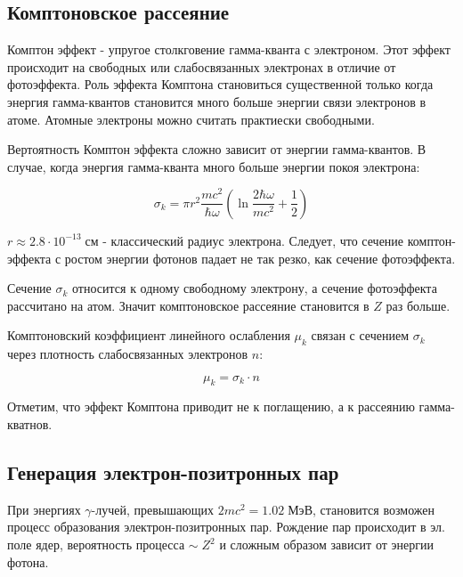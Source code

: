 \documentclass[a4paper]{article}
\begin{document}
\subsection{Комптоновское рассеяние}

Комптон эффект - упругое столкговение гамма-кванта с электроном. Этот эффект происходит на свободных 
или слабосвязанных электронах в отличие от фотоэффекта. Роль эффекта Комптона становиться существенной 
только когда энергия гамма-квантов становится много больше энергии связи электронов в атоме. Атомные электроны
можно считать практиески свободными. \par 

Вертоятность Комптон эффекта сложно зависит от энергии гамма-квантов. В случае, когда энергия 
гамма-кванта много больше энергии покоя электрона:

\begin{equation}
    \sigma_k = \pi r^2 \frac{mc^2}{\hbar \omega} \left ( \ln{\frac{2 \hbar \omega}{mc^2}}+ \frac{1}{2} \right )
\end{equation}

$r \approx 2.8 \cdot 10^{-13} \; см$ - классический радиус электрона. Следует, что сечение комптон-эффекта 
с ростом энергии фотонов падает не так резко, как сечение фотоэффекта. \par 

Сечение $\sigma_k$ относится к одному свободному электрону, а сечение фотоэффекта рассчитано на атом. 
Значит комптоновское рассеяние становится в $Z$ раз больше. \par 

Комптоновский коэффициент линейного ослабления $\mu_k$ связан с сечением $\sigma_k$ через плотность слабосвязанных 
электронов $n$:

\begin{equation}
    \mu_k = \sigma_k \cdot n
\end{equation}

Отметим, что эффект Комптона приводит не к поглащению, а к рассеянию гамма-кватнов. 



\subsection{Генерация электрон-позитронных пар}

При энергиях $\gamma$-лучей, превышающих $2mc^2 = 1.02 \; МэВ$, становится возможен процесс образования 
электрон-позитронных пар. Рождение пар происходит в эл. поле ядер, вероятность процесса $\sim \; Z^2$ и сложным
образом зависит от энергии фотона. \par 
\end{document}
